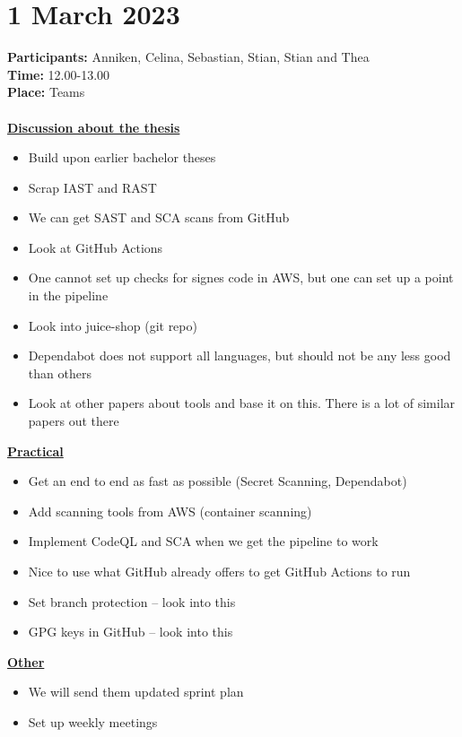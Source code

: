 \section{1 March 2023}
\textbf{Participants:} Anniken, Celina, Sebastian, Stian, Stian and Thea \\
\textbf{Time:} 12.00-13.00 \\
\textbf{Place:} Teams
\\~\\
\textbf{\underline{Discussion about the thesis}}
\begin{itemize}
    \item Build upon earlier bachelor theses 
    \item Scrap IAST and RAST
    \item We can get SAST and SCA scans from GitHub
    \item Look at GitHub Actions
    \item One cannot set up checks for signes code in AWS, but one can set up a point in the pipeline
    \item Look into juice-shop (git repo)
    \item Dependabot does not support all languages, but should not be any less good than others
    \item Look at other papers about tools and base it on this. There is a lot of similar papers out there
\end{itemize}

\textbf{\underline{Practical}}
\begin{itemize}
    \item Get an end to end as fast as possible (Secret Scanning, Dependabot)
    \item Add scanning tools from AWS (container scanning)
    \item Implement CodeQL and SCA when we get the pipeline to work
    \item Nice to use what GitHub already offers to get GitHub Actions to run
    \item Set branch protection – look into this
    \item GPG keys in GitHub – look into this
    
\end{itemize}

\textbf{\underline{Other}}
\begin{itemize}
    \item We will send them updated sprint plan
    \item Set up weekly meetings
\end{itemize}	

